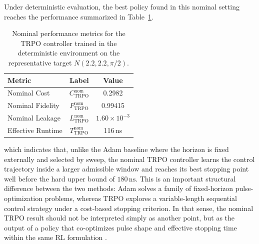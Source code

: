
Under deterministic evaluation, the best policy found in this nominal setting reaches the performance summarized in Table~\ref{tab:nominal_trpo_results}.

\begin{table}[ht]
\centering
\begin{tabular}{lcc}
\hline
Metric & Label & Value \\
\hline
Nominal Cost & \(C_{\mathrm{TRPO}}^{\mathrm{nom}}\) & 0.2982 \\
Nominal Fidelity & \(F_{\mathrm{TRPO}}^{\mathrm{nom}}\) & 0.99415 \\
Nominal Leakage & \(L_{\mathrm{TRPO}}^{\mathrm{nom}}\) & $1.60\times 10^{-3}$ \\
Effective Runtime & \(T_{\mathrm{TRPO}}^{\mathrm{nom}}\) & 116\,ns \\
\hline
\end{tabular}
\caption{Nominal performance metrics for the TRPO controller trained in the deterministic environment on the representative target $N(2.2, 2.2, \pi/2)$.}
\label{tab:nominal_trpo_results}
\end{table}
which indicates that, unlike the Adam baseline where the horizon is fixed externally and selected by sweep, the nominal TRPO controller learns the control trajectory inside a larger admissible window and reaches its best stopping point well before the hard upper bound of \(180\,\mathrm{ns}\). This is an important structural difference between the two methods: Adam solves a family of fixed-horizon pulse-optimization problems, whereas TRPO explores a variable-length sequential control strategy under a cost-based stopping criterion. In that sense, the nominal TRPO result should not be interpreted simply as another point, but as the output of a policy that co-optimizes pulse shape and effective stopping time within the same RL formulation \cite{Niu2019}.


